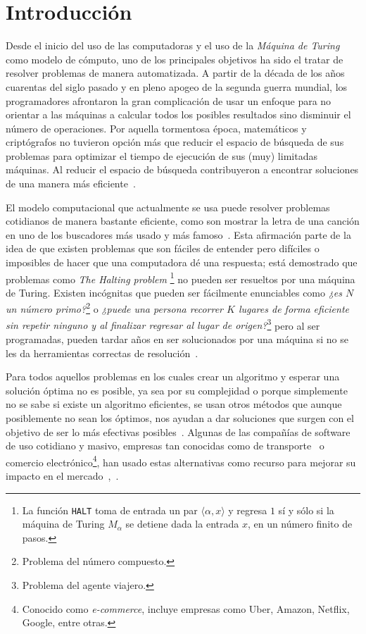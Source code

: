 \chapter{Introducción}

Desde el inicio del uso de las computadoras y el uso de la \textit{Máquina de
  Turing} como modelo de cómputo, uno de los principales objetivos ha sido el
tratar de resolver problemas de manera automatizada. A partir de la década de
los años cuarentas del siglo pasado y en pleno apogeo de la segunda guerra
mundial, los programadores afrontaron la gran complicación de usar un enfoque
para no orientar a las máquinas a calcular todos los posibles resultados sino
disminuir el número de operaciones. Por aquella tormentosa época, matemáticos y
criptógrafos no tuvieron opción más que reducir el espacio de búsqueda de sus
problemas para optimizar el tiempo de ejecución de sus (muy) limitadas
máquinas. Al reducir el espacio de búsqueda contribuyeron a encontrar soluciones
de una manera más eficiente~\cite{GalavizCasas}.

El modelo computacional que actualmente se usa puede resolver problemas
cotidianos de manera bastante eficiente, como son mostrar la letra de una canción en
uno de los buscadores más usado y más famoso~\cite{Harikumar}. Esta afirmación
parte de la idea de que existen problemas que son fáciles de entender pero
difíciles o imposibles de hacer que una computadora dé una respuesta;
está demostrado que problemas como \textit{The Halting problem}
\footnote{La función \texttt{HALT} toma de entrada un par $\langle \alpha, x
\rangle$ y regresa $1$ sí y sólo si la máquina de Turing $M_{\alpha}$ se
detiene dada la entrada $x$, en un número finito de pasos.} no pueden
ser resueltos por una máquina de Turing.
Existen incógnitas que pueden ser fácilmente enunciables como \textit{¿es $N$ un número
primo?}\footnote{Problema del número compuesto.} o \textit{¿puede una persona
recorrer $K$ lugares de forma eficiente sin repetir ninguno y al finalizar
regresar al lugar de origen?}\footnote{Problema del agente viajero.} pero al ser programadas,
pueden tardar años en ser solucionados por una máquina si no se les da
herramientas correctas de resolución~\cite{arora2009computational}.

Para todos aquellos problemas en los cuales crear un algoritmo y esperar
una solución óptima no es posible, ya sea por su complejidad o porque
simplemente no se sabe si existe un algoritmo eficientes, se usan otros métodos
que aunque posiblemente no sean los óptimos, nos ayudan a dar soluciones que
surgen con el objetivo de ser lo más efectivas posibles~\cite{Pearl1984}.
Algunas de las compañías de software de uso cotidiano y masivo, empresas tan
conocidas como de transporte~\cite{uber-heuristic} o comercio electrónico\footnote{Conocido como \textit{e-commerce}, incluye empresas como Uber,
Amazon, Netflix, Google, entre otras.}, han usado estas
alternativas como recurso para mejorar su impacto en el mercado~\cite{Linden},~\cite{Smith2017}.

